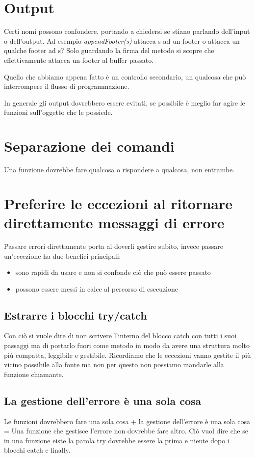 \documentclass[11pt,a4paper]{book}
\begin{document}
\section{Output}
Certi nomi possono confondere, portando a chiedersi se stiano parlando dell'input o dell'output. Ad esempio \emph{appendFooter(s)} attacca s ad un footer o attacca un qualche footer ad s? Solo guardando la firma del metodo si scopre che
\label{code: 020}
effettivamente attacca un footer al buffer passato.

Quello che abbiamo appena fatto è un controllo secondario, un qualcosa che può interrompere il flusso di programmazione.

In generale gli output dovrebbero essere evitati, se possibile è meglio far agire le funzioni sull'oggetto che le possiede.

\section{Separazione dei comandi}
Una funzione dovrebbe fare qualcosa o rispondere a qualcosa, non entrambe.

\section{Preferire le eccezioni al ritornare direttamente messaggi di errore}
Passare errori direttamente porta al doverli gestire subito, invece passare un'eccezione ha due benefici principali:
\begin{itemize}
	\item sono rapidi da usare e non si confonde ciò che può essere passato
	\item possono essere messi in calce al percorso di esecuzione
\end{itemize}

\subsection{Estrarre i blocchi try/catch}
Con ciò si vuole dire di non scrivere l'interno del blocco catch con tutti i suoi passaggi ma di portarlo fuori come metodo in modo da avere una struttura molto più compatta, leggibile e gestibile. Ricordiamo che le eccezioni vanno gestite il più vicino possibile alla fonte ma non per questo non possiamo mandarle alla funzione chiamante.
\label{code: 021}

\subsection{La gestione dell'errore è una sola cosa}
Le funzioni dovrebbero fare una sola cosa + la gestione dell'errore è una sola cosa = Una funzione che gestisce l'errore non dovrebbe fare altro. Ciò vuol dire che se in una funzione eiste la parola try dovrebbe essere la prima e niente dopo i blocchi catch e finally.
\end{document}

